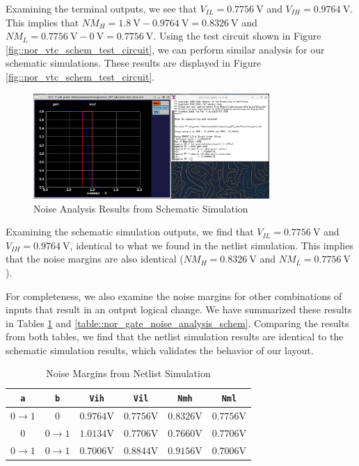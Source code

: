\documentclass{article}
\begin{document}
	\noindent Examining the terminal outputs, we see that $V_{IL} = 0.7756\ \text{V}$ and $V_{IH} = 0.9764\ \text{V}$. This implies that $NM_H = 1.8\ \text{V} - 0.9764\ \text{V} = 0.8326\ \text{V}$ and $NM_L = 0.7756\ \text{V} - 0\ \text{V} = 0.7756\ \text{V}$. Using the test circuit shown in Figure \ref{fig::nor_vtc_schem_test_circuit}, we can perform similar analysis for our schematic simulations. These results are displayed in Figure \ref{fig::nor_vtc_schem_test_circuit}.
	
	\begin{figure}[H]
		\centerline{\includegraphics[width=0.8\textwidth]{nor_noise_analysis_schem.png}}
		\caption{Noise Analysis Results from Schematic Simulation}
		\label{fig::nor_noise_analysis_schem}
	\end{figure}
	
	\noindent Examining the schematic simulation outputs, we find that $V_{IL} = 0.7756\ \text{V}$ and $V_{IH} = 0.9764\ \text{V}$, identical to what we found in the netlist simulation. This implies that the noise margins are also identical ($NM_H = 0.8326\ \text{V}$ and $NM_L = 0.7756\ \text{V}$).	
	
	For completeness, we also examine the noise margins for other combinations of inputs that result in an output logical change. We have summarized these results in Tables \ref{table::nor_gate_noise_analysis} and \ref{table::nor_gate_noise_analysis_schem}. Comparing the results from both tables, we find that the netlist simulation results are identical to the schematic simulation results, which validates the behavior of our layout.
	
	\begin{table}[H]
	\begin{center}
	\caption{Noise Margins from Netlist Simulation}
	\label{table::nor_gate_noise_analysis}
	\begin{tabular}{| c | c | c | c | c | c |}
		\hline
		\texttt{a} & \texttt{b} & \texttt{Vih} & \texttt{Vil} & \texttt{Nmh} & \texttt{Nml} \\
		\hline	
		$0 \rightarrow 1$ & $0$ & $0.9764 \text{V}$ & $0.7756 \text{V}$ & $0.8326 \text{V}$ & $0.7756 \text{V}$\\
		\hline	
		$0$ & $0 \rightarrow 1$ & $1.0134 \text{V}$ & $0.7706 \text{V}$ & $0.7660 \text{V}$ & $0.7706 \text{V}$\\
		\hline	
		$0 \rightarrow 1$ & $0 \rightarrow 1$ & $0.7006 \text{V}$ & $0.8844 \text{V}$ & $0.9156 \text{V}$ & $0.7006 \text{V}$\\
		\hline
	\end{tabular}
	\end{center}
	\end{table}
	
\end{document}
